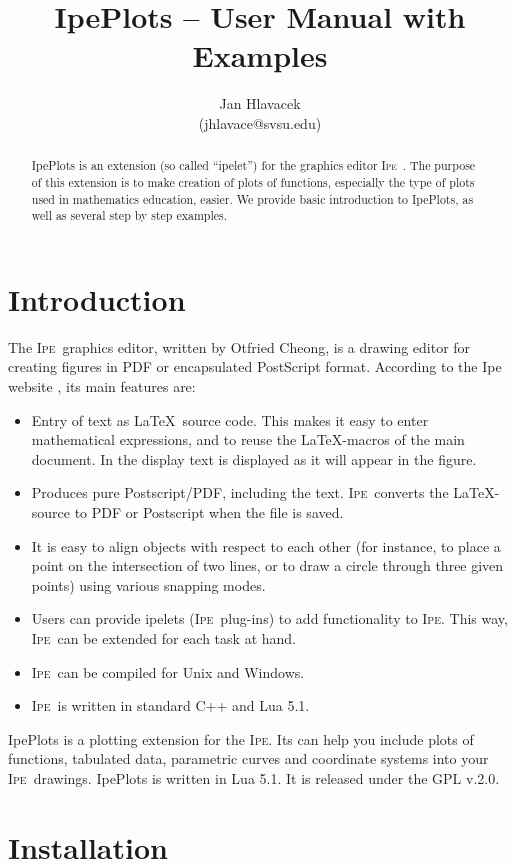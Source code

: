 \documentclass{article}
\title{IpePlots -- User Manual with Examples}
\author{Jan Hlavacek\\(jhlavace@svsu.edu)}
\def\Ipe{\textsc{Ipe}}
\begin{document}
\maketitle
\tableofcontents
\begin{abstract}
   IpePlots is an extension (so called ``ipelet'') for the graphics editor \Ipe\ \cite{ipeweb}.  The purpose of this extension is to
   make creation of plots of functions, especially the type of plots used in
   mathematics education, easier.  We provide basic introduction to IpePlots,
   as well as several step by step examples. 
\end{abstract}

\section{Introduction}
The \Ipe\ graphics editor, written by Otfried Cheong, is a drawing editor for
creating figures in PDF or encapsulated PostScript format. According to the Ipe
website \cite{ipeweb}, its main features are:
\begin{itemize}
   \item Entry of text as \LaTeX\ source code. This makes it easy to enter
      mathematical expressions, and to reuse the \LaTeX-macros of the main
      document. In the display text is displayed as it will appear in the
      figure.
   \item Produces pure Postscript/PDF, including the text. \Ipe\ converts the \LaTeX-source to PDF or Postscript when the file is saved.
   \item  It is easy to align objects with respect to each other (for instance,
      to place a point on the intersection of two lines, or to draw a circle
      through three given points) using various snapping modes.
   \item  Users can provide ipelets (\Ipe\ plug-ins) to add functionality to
      \Ipe. This way, \Ipe\ can be extended for each task at hand.
   \item  \Ipe\ can be compiled for Unix and Windows.
   \item  \Ipe\ is written in standard C++ and Lua 5.1. 
\end{itemize}
IpePlots is a plotting extension for the \Ipe. Its can help you include plots
of functions, tabulated data, parametric curves and coordinate systems into your \Ipe\
drawings.  IpePlots is written in Lua 5.1.  It is released under the GPL v.2.0.

\section{Installation}
\end{document}
